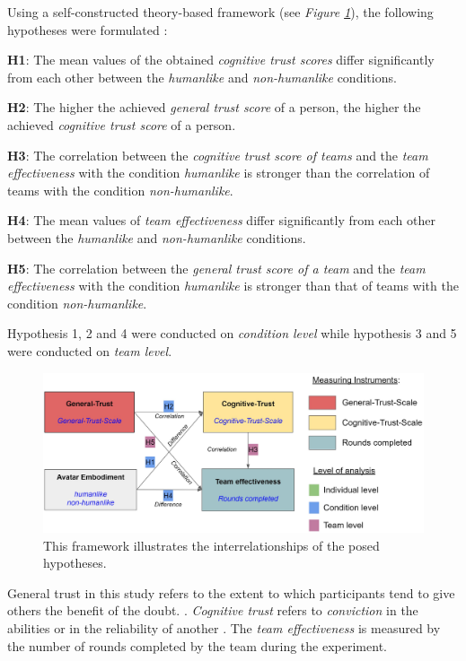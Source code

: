 \documentclass[sigchi]{acmart}
\begin{document}
Using a self-constructed theory-based framework (see \textit{Figure \ref{Versuchshypothesen}}), the following hypotheses were formulated :

\textbf{H1}: The mean values of the obtained \textit{cognitive trust scores} differ significantly from each other between the \textit{humanlike} and \textit{non-humanlike} conditions.

\textbf{H2}: The higher the achieved \textit{general trust score} of a person, the higher the achieved \textit{cognitive trust score} of a person.

\textbf{H3}: The correlation between the \textit{cognitive trust score of teams} and the \textit{team effectiveness} with the condition \textit{humanlike} is stronger than the correlation of teams with the condition \textit{non-humanlike}.

\textbf{H4}: The mean values of \textit{team effectiveness} differ significantly from each other between the \textit{humanlike} and \textit{non-humanlike} conditions.

\textbf{H5}: The correlation between the \textit{general trust score of a team} and the \textit{team effectiveness} with the condition \textit{humanlike} is stronger than that of teams with the condition \textit{non-humanlike}.

Hypothesis 1, 2 and 4 were conducted on \textit{condition level} while hypothesis 3 and 5 were conducted on \textit{team level}.
\begin{figure}[H]
		\begin{footnotesize}
			\includegraphics[width=\linewidth]{Abbildungen/Versuchshypothesen_02.JPG}		
			\caption[The self-constructed framework of experimental hypotheses]{This framework illustrates the interrelationships of the posed hypotheses.}
			\label{Versuchshypothesen}
		\end{footnotesize}
	\end{figure}	

General trust in this study refers to the extent to which participants tend to give others the benefit of the doubt. \citep[p. 30]{mcallister1995affect}.
\textit{Cognitive trust} refers to \textit{conviction} in the abilities or in the reliability of another \citep[p. 30]{mcallister1995affect}.
The \textit{team effectiveness} is measured by the number of rounds completed by the team during the experiment.
\end{document}
